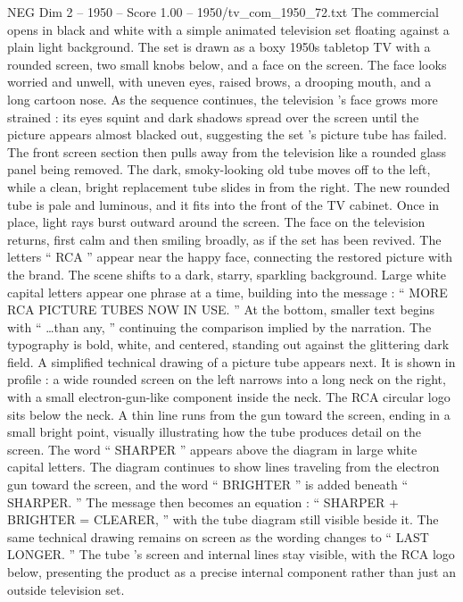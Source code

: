\begin{textsample}{NEG Dim 2 – 1950 – Score 1.00 – 1950/tv\_com\_1950\_72.txt}  \label{ex:f2_neg_014}
The commercial opens in black and white with a simple animated television set floating against a plain light background.
The set is drawn as a boxy 1950s tabletop TV with a rounded screen, two small knobs below, and a face on the screen.
The face looks worried and unwell, with uneven eyes, raised brows, a drooping mouth, and a long cartoon nose.
As the sequence continues, the television ’s face grows more strained : its eyes squint and dark shadows spread over the screen until the picture appears almost blacked out, suggesting the set ’s picture tube has failed.
The front screen section then pulls away from the television like a rounded glass panel being removed.
The dark, smoky-looking old tube moves off to the left, while a clean, bright replacement tube slides in from the right.
The new rounded tube is pale and luminous, and it fits into the front of the TV cabinet.
Once in place, light rays burst outward around the screen.
The face on the television returns, first calm and then smiling broadly, as if the set has been revived.
The letters “ RCA ” appear near the happy face, connecting the restored picture with the brand.
The scene shifts to a dark, starry, sparkling background.
Large white capital letters appear one phrase at a time, building into the message : “ MORE RCA PICTURE TUBES NOW IN USE. ” At the bottom, smaller text begins with “ …than any, ” continuing the comparison implied by the narration.
The typography is bold, white, and centered, standing out against the glittering dark field.
A simplified technical drawing of a picture tube appears next.
It is shown in profile : a wide rounded screen on the left narrows into a long neck on the right, with a small electron-gun-like component inside the neck.
The RCA circular logo sits below the neck.
A thin line runs from the gun toward the screen, ending in a small bright point, visually illustrating how the tube produces detail on the screen.
The word “ SHARPER ” appears above the diagram in large white capital letters.
The diagram continues to show lines traveling from the electron gun toward the screen, and the word “ BRIGHTER ” is added beneath “ SHARPER. ” The message then becomes an equation : “ SHARPER + BRIGHTER = CLEARER, ” with the tube diagram still visible beside it.
The same technical drawing remains on screen as the wording changes to “ LAST LONGER. ” The tube ’s screen and internal lines stay visible, with the RCA logo below, presenting the product as a precise internal component rather than just an outside television set.

\end{textsample}
